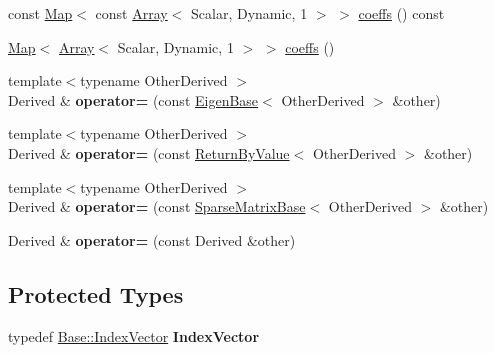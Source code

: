 \begin{DoxyCompactItemize}
\item 
const \mbox{\hyperlink{class_eigen_1_1_map}{Map}}$<$ const \mbox{\hyperlink{class_eigen_1_1_array}{Array}}$<$ Scalar, Dynamic, 1 $>$ $>$ \mbox{\hyperlink{class_eigen_1_1_sparse_compressed_base_a101b155485ae59ea1261c4f6040f3dc4}{coeffs}} () const
\item 
\mbox{\hyperlink{class_eigen_1_1_map}{Map}}$<$ \mbox{\hyperlink{class_eigen_1_1_array}{Array}}$<$ Scalar, Dynamic, 1 $>$ $>$ \mbox{\hyperlink{class_eigen_1_1_sparse_compressed_base_a7cf299e08d2a4f6d6869e631e51b12fe}{coeffs}} ()
\item 
\mbox{\label{class_eigen_1_1_sparse_compressed_base_a379e2a65ec661cceaddc225120ad5cb1}} 
{\footnotesize template$<$typename Other\+Derived $>$ }\\Derived \& {\bfseries operator=} (const \mbox{\hyperlink{struct_eigen_1_1_eigen_base}{Eigen\+Base}}$<$ Other\+Derived $>$ \&other)
\item 
\mbox{\label{class_eigen_1_1_sparse_compressed_base_a3365b1d14b9f6c5d832169b3d07511a4}} 
{\footnotesize template$<$typename Other\+Derived $>$ }\\Derived \& {\bfseries operator=} (const \mbox{\hyperlink{class_eigen_1_1_return_by_value}{Return\+By\+Value}}$<$ Other\+Derived $>$ \&other)
\item 
\mbox{\label{class_eigen_1_1_sparse_compressed_base_aa171e4de58f2bddb8da0358961c6d3fd}} 
{\footnotesize template$<$typename Other\+Derived $>$ }\\Derived \& {\bfseries operator=} (const \mbox{\hyperlink{class_eigen_1_1_sparse_matrix_base}{Sparse\+Matrix\+Base}}$<$ Other\+Derived $>$ \&other)
\item 
\mbox{\label{class_eigen_1_1_sparse_compressed_base_af2eba8c3ea2424df618f3e90f1b5254b}} 
Derived \& {\bfseries operator=} (const Derived \&other)
\end{DoxyCompactItemize}
\subsection*{Protected Types}
\begin{DoxyCompactItemize}
\item 
\mbox{\label{class_eigen_1_1_sparse_compressed_base_acc50cb384fd20531686be881851168cc}} 
typedef \mbox{\hyperlink{class_eigen_1_1_matrix}{Base\+::\+Index\+Vector}} {\bfseries Index\+Vector}
\end{DoxyCompactItemize}
